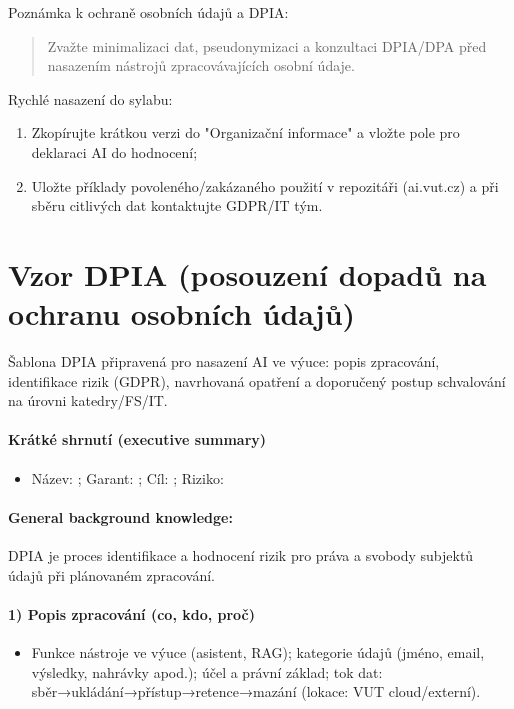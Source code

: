 \documentclass{report}%
\begin{document}
Poznámka k ochraně osobních údajů a DPIA: \begin{quote}Zvažte minimalizaci dat, pseudonymizaci a konzultaci DPIA/DPA před nasazením nástrojů zpracovávajících osobní údaje.\end{quote}

Rychlé nasazení do sylabu: \begin{enumerate}\item Zkopírujte krátkou verzi do "Organizační informace" a vložte pole pro deklaraci AI do hodnocení; \item Uložte příklady povoleného/zakázaného použití v repozitáři (ai.vut.cz) a při sběru citlivých dat kontaktujte GDPR/IT tým.\end{enumerate}%

%
\section{Vzor DPIA (posouzení dopadů na ochranu osobních údajů)}%
Šablona DPIA připravená pro nasazení AI ve výuce: popis zpracování, identifikace rizik (GDPR), navrhovaná opatření a doporučený postup schvalování na úrovni katedry/FS/IT.%


%
\paragraph{Krátké shrnutí (executive summary)}
\begin{itemize}
\item Název: \underline{\hspace{8cm}}; Garant: \underline{\hspace{6cm}}; Cíl: \underline{\hspace{6cm}}; Riziko: \underline{\hspace{3cm}}
\end{itemize}
\paragraph{General background knowledge:} DPIA je proces identifikace a hodnocení rizik pro práva a svobody subjektů údajů při plánovaném zpracování.
\paragraph{1) Popis zpracování (co, kdo, proč)}
\begin{itemize}
\item Funkce nástroje ve výuce (asistent, RAG); kategorie údajů (jméno, email, výsledky, nahrávky apod.); účel a právní základ; tok dat: sběr→ukládání→přístup→retence→mazání (lokace: VUT cloud/externí).
\end{itemize}
\end{document}
